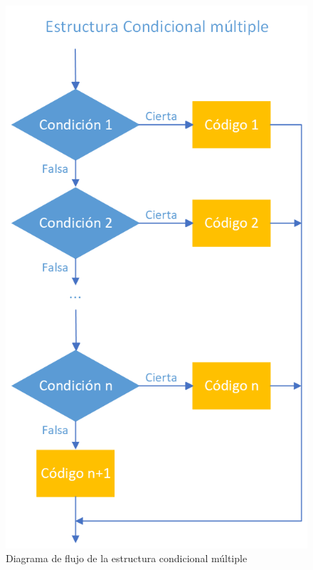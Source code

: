 \documentclass[
  a4paper,
]{scrreport}
\theoremstyle{definition}
\theoremstyle{definition}
\theoremstyle{remark}
\begin{document}
\begin{figure}

{\centering \includegraphics{img/04-estructuras-control/condicional-multiple.png}

}

\caption{Diagrama de flujo de la estructura condicional múltiple}

\end{figure}
\end{document}
